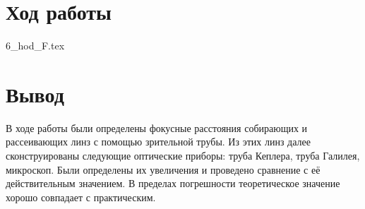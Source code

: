 \documentclass[a5paper,10pt, twoside]{article} %
\begin{document}
\section{Ход работы}
{6_hod_F.tex}

\section{Вывод}
В ходе работы были определены фокусные расстояния собирающих и рассеивающих линз с помощью
зрительной трубы. 
\newline
Из этих линз далее сконструированы следующие оптические приборы: труба Кеплера, труба
Галилея, микроскоп. 
\newline
Были определены их увеличения и проведено сравнение с её действительным значением. В пределах
погрешности теоретическое значение хорошо совпадает с практическим.
\end{document}
